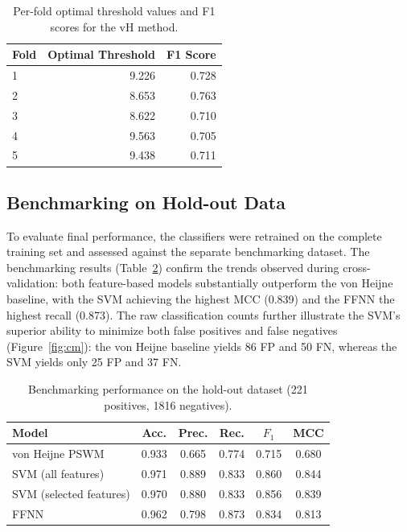 \documentclass[unnumsec,webpdf,contemporary,large]{oup-authoring-template}
\begin{document}
\begin{table}[t]
\caption{Per-fold optimal threshold values and F1 scores for the vH method.}
\label{tab:folds}
\centering
\begin{tabular}{lrr}
\toprule
Fold & Optimal Threshold & F1 Score \\
\midrule
1 & 9.226 & 0.728 \\
2 & 8.653 & 0.763 \\
3 & 8.622 & 0.710 \\
4 & 9.563 & 0.705 \\
5 & 9.438 & 0.711 \\
\bottomrule
\end{tabular}
\end{table}

\subsection{Benchmarking on Hold-out Data}

To evaluate final performance, the classifiers were retrained on the complete training set and assessed against the separate benchmarking dataset. The benchmarking results (Table~\ref{tab:benchmark}) confirm the trends observed during cross-validation: both feature-based models substantially outperform the von Heijne baseline, with the SVM achieving the highest MCC (0.839) and the FFNN the highest recall (0.873). The raw classification counts further illustrate the SVM's superior ability to minimize both false positives and false negatives (Figure~\ref{fig:cm}): the von Heijne baseline yields 86 FP and 50 FN, whereas the SVM yields only 25 FP and 37 FN.

\begin{table}[t]
\caption{Benchmarking performance on the hold-out dataset (221 positives, 1816 negatives).}
\label{tab:benchmark}
\centering
\begin{tabular}{lccccc}
\toprule
Model & Acc. & Prec. & Rec. & $F_1$ & MCC \\
\midrule
von Heijne PSWM         & 0.933 & 0.665 & 0.774 & 0.715 & 0.680 \\
SVM (all features)      & 0.971 & 0.889 & 0.833 & 0.860 & 0.844 \\
SVM (selected features) & 0.970 & 0.880 & 0.833 & 0.856 & 0.839 \\
FFNN                    & 0.962 & 0.798 & 0.873 & 0.834 & 0.813 \\
\bottomrule
\end{tabular}
\end{table}
\end{document}

